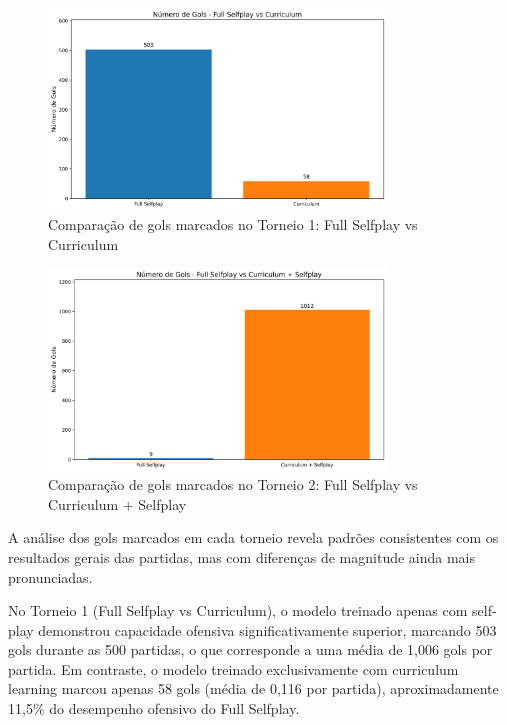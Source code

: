\begin{figure}[H]
    \centering
    \includegraphics[width=0.8\textwidth]{fig/graficos_trabalho/graficos_torneios/torneios/gols_full_selfplay_vs_curriculum.png}
    \caption{Comparação de gols marcados no Torneio 1: Full Selfplay vs Curriculum}
    \label{fig:gols_torneio1}
\end{figure}

\begin{figure}[H]
    \centering
    \includegraphics[width=0.8\textwidth]{fig/graficos_trabalho/graficos_torneios/torneios/gols_full_selfplay_vs_curriculum_+_selfplay.png}
    \caption{Comparação de gols marcados no Torneio 2: Full Selfplay vs Curriculum + Selfplay}
    \label{fig:gols_torneio2}
\end{figure}

A análise dos gols marcados em cada torneio revela padrões consistentes com os resultados gerais das partidas, mas com diferenças de magnitude ainda mais pronunciadas.

No Torneio 1 (Full Selfplay vs Curriculum), o modelo treinado apenas com self-play demonstrou capacidade ofensiva significativamente superior, marcando 503 gols durante as 500 partidas, o que corresponde a uma média de 1,006 gols por partida. Em contraste, o modelo treinado exclusivamente com curriculum learning marcou apenas 58 gols (média de 0,116 por partida), aproximadamente 11,5\% do desempenho ofensivo do Full Selfplay.

